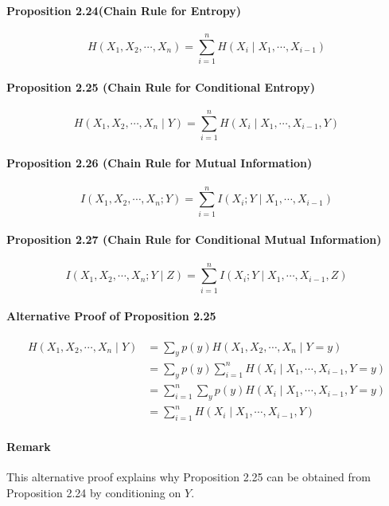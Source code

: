 \documentclass[8pt]{article}
\begin{document}
\begin{tcolorbox}
\paragraph{Proposition 2.24(Chain Rule for Entropy)}
$$
H \left(X_{1}, X_{2}, \cdots, X_{n}\right)=\sum_{i=1}^{n} H\left(X_{i} \mid X_{1}, \cdots, X_{i-1}\right)
$$

\paragraph{Proposition 2.25 (Chain Rule for Conditional Entropy)}
$$
H\left(X_{1}, X_{2}, \cdots, X_{n} \mid Y\right)=\sum_{i=1}^{n} H\left(X_{i} \mid X_{1}, \cdots, X_{i-1}, Y\right)
$$

\paragraph{Proposition 2.26 (Chain Rule for Mutual Information)}
$$
I\left(X_{1}, X_{2}, \cdots, X_{n} ; Y\right)=\sum_{i=1}^{n} I\left(X_{i} ; Y \mid X_{1}, \cdots, X_{i-1}\right)
$$

\paragraph{Proposition 2.27 (Chain Rule for Conditional Mutual Information)}
$$
I\left(X_{1}, X_{2}, \cdots, X_{n} ; Y \mid Z\right)=\sum_{i=1}^{n} I\left(X_{i} ; Y \mid X_{1}, \cdots, X_{i-1}, Z\right)
$$
\end{tcolorbox}

\paragraph{Alternative Proof of Proposition 2.25}
$$
\begin{aligned}
H\left(X_{1}, X_{2}, \cdots, X_{n} \mid Y\right) &= \sum_{y} p(y) H\left(X_{1}, X_{2}, \cdots, X_{n} \mid Y=y\right) \\
&=\sum_{y} p(y) \sum_{i=1}^{n} H\left(X_{i} \mid X_{1}, \cdots, X_{i-1}, Y=y\right) \\
&=\sum_{i=1}^{n} \sum_{y} p(y) H\left(X_{i} \mid X_{1}, \cdots, X_{i-1}, Y=y\right) \\
&=\sum_{i=1}^{n} H\left(X_{i} \mid X_{1}, \cdots, X_{i-1}, Y\right)
\end{aligned}
$$
\paragraph{Remark} This alternative proof explains why Proposition 2.25 can be obtained from Proposition 2.24 by conditioning on $Y$.
\end{document}

